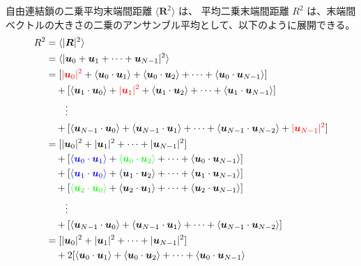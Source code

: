\documentclass[uplatex,dvipdfmx,a4paper,11pt, titlepage]{jsarticle}
\begin{document}
\begin{appendix}
自由連結鎖の二乗平均末端間距離 $\langle \bm{R}^2 \rangle$ は、
平均二乗末端間距離 $R^2$ は、末端間ベクトルの大きさの二乗のアンサンブル平均として、以下のように展開できる。
\begin{align*}
	R^2
		&= \langle |\bm{R}|^2 \rangle \notag \\
		&= \langle |\bm{u}_0 + \bm{u}_1 + \cdots + \bm{u}_{N-1}|^2 \rangle \notag \\
		&= 
			[ 
			{\color{red} |\bm{u}_0|^2} + \langle \bm{u}_0 \cdot \bm{u}_1 \rangle + \langle \bm{u}_0 \cdot \bm{u}_2 \rangle + \cdots + \langle \bm{u}_0 \cdot \bm{u}_{N-1} \rangle 
			] \notag \\
		&\quad+ 
			[ 
			\langle \bm{u}_1 \cdot \bm{u}_0 \rangle + {\color{red} |\bm{u}_1|^2} + \langle \bm{u}_1 \cdot \bm{u}_2 \rangle + \cdots + \langle \bm{u}_1 \cdot \bm{u}_{N-1} \rangle 
			] \notag \\
		&\quad\quad \vdots \notag \\
		&\quad+ 
			[ 
			\langle \bm{u}_{N-1} \cdot \bm{u}_0 \rangle + \langle \bm{u}_{N-1} \cdot \bm{u}_1 \rangle + \cdots + \langle \bm{u}_{N-1} \cdot \bm{u}_{N-2} \rangle + {\color{red} |\bm{u}_{N-1}|^2} 
			] \notag \\
		&= 
			[ 
			|\bm{u}_0|^2 +  |\bm{u}_1|^2 + \cdots + |\bm{u}_{N-1}|^2 
			] \notag \\
		&\quad+		
			[
			{\color{blue} \langle \bm{u}_0 \cdot \bm{u}_1 \rangle} + {\color{green} \langle \bm{u}_0 \cdot \bm{u}_2 \rangle} + \cdots + \langle \bm{u}_0 \cdot \bm{u}_{N-1} \rangle 
			] \notag \\
		&\quad+ 
			[ 
			{\color{blue} \langle \bm{u}_1 \cdot \bm{u}_0 \rangle} +\langle \bm{u}_1 \cdot \bm{u}_2 \rangle + \cdots + \langle \bm{u}_1 \cdot \bm{u}_{N-1} \rangle 
			] \notag \\
		&\quad+ 
			[ 
			{\color{green} \langle \bm{u}_2 \cdot \bm{u}_0 \rangle} +\langle \bm{u}_2 \cdot \bm{u}_1 \rangle + \cdots + \langle \bm{u}_2 \cdot \bm{u}_{N-1} \rangle 
			] \notag \\
		&\quad\quad \vdots \notag \\
		&\quad+ 
			[ 
			\langle \bm{u}_{N-1} \cdot \bm{u}_0 \rangle + \langle \bm{u}_{N-1} \cdot \bm{u}_1 \rangle + \cdots + \langle \bm{u}_{N-1} \cdot \bm{u}_{N-2} \rangle
			] \notag \\
		&= 
			[ 
			|\bm{u}_0|^2 +  |\bm{u}_1|^2 + \cdots + |\bm{u}_{N-1}|^2 
			] \notag \\
%
		&\quad+		
			2[
			\langle \bm{u}_0 \cdot \bm{u}_1 \rangle + \langle \bm{u}_0 \cdot \bm{u}_2 \rangle + \cdots + \langle \bm{u}_0 \cdot \bm{u}_{N-1} \rangle 

\end{align*}
\end{appendix}
\end{document}
